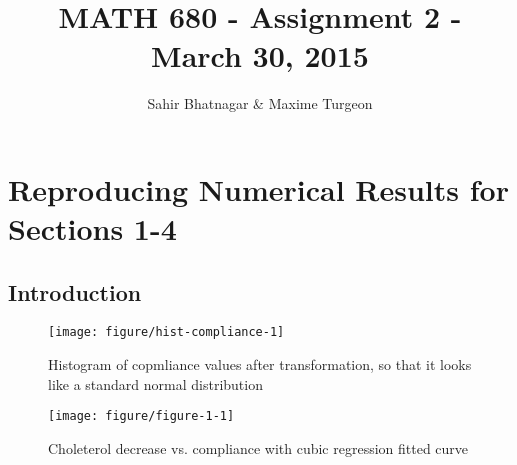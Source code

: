 \documentclass[11pt,letter]{article}\usepackage[]{graphicx}\usepackage[]{color}
\makeatletter
\def\maxwidth{ %
  \ifdim\Gin@nat@width>\linewidth
    \linewidth
  \else
    \Gin@nat@width
  \fi
}
\newenvironment{knitrout}{}{} %
\makeatother
\begin{document}
\pagestyle{fancy}


\title{MATH 680 - Assignment 2 - March 30, 2015}
\author{Sahir Bhatnagar \& Maxime Turgeon}

\maketitle


\section{Reproducing Numerical Results for Sections 1-4}



\subsection{Introduction}



\begin{knitrout}
\color{fgcolor}\begin{figure}

{\centering \texttt{[image: figure/hist-compliance-1]} 

}

\caption[Histogram of copmliance values after transformation, so that it looks like a standard normal distribution]{Histogram of copmliance values after transformation, so that it looks like a standard normal distribution}\label{fig:hist-compliance}
\end{figure}


\end{knitrout}

\begin{knitrout}
\color{fgcolor}\begin{figure}

{\centering \texttt{[image: figure/figure-1-1]} 

}

\caption[Choleterol decrease vs]{Choleterol decrease vs. compliance with cubic regression fitted curve}\label{fig:figure-1}
\end{figure}


\end{knitrout}
\end{document}
